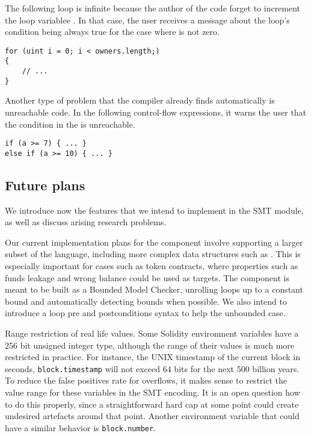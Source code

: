 The following loop is infinite because the author of the code
forget to increment the loop variablee .
%
In that case, the user receives a message about the loop's condition being
always true for the case where  is not zero.

\begin{verbatim}
for (uint i = 0; i < owners.length;)
{
    // ...
}
\end{verbatim}

Another type of problem that the compiler already finds automatically is
unreachable code.
%
In the following control-flow expressions, it warns the user that the condition
in the  is unreachable.

\begin{verbatim}
if (a >= 7) { ... }
else if (a >= 10) { ... }
\end{verbatim}


\subsection{Future plans}

We introduce now the features that we intend to implement in the SMT module, as
well as discuss arising research problems.

Our current implementation plans for the component involve supporting
a larger subset of the language, including more complex data structures
such as .
%
This is especially important for cases such as token contracts, where
properties such as funds leakage and wrong balance could be used as targets.
%
The component is meant to be built as a Bounded Model Checker, unrolling loops
up to a constant bound and automatically detecting bounds when possible.
%
We also intend to introduce a loop pre and postconditions syntax to help the
unbounded case.

\begin{paragraph}{Range restriction of real life values.}
Some Solidity environment variables have a 256 bit unsigned integer type,
although the range of their values is much more restricted in practice.
For instance, the UNIX timestamp of the current block in seconds,
\texttt{block.timestamp} will not exceed 64 bits for the next
500 billion years. To reduce the false positives rate for
overflows, it makes sense to restrict the value range for these
variables in the SMT encoding. It is an open question how to do
this properly, since a straightforward hard cap at some point
could create undesired artefacts around that point.
%
Another environment variable that could have a similar
behavior is \texttt{block.number}.
\end{paragraph}

